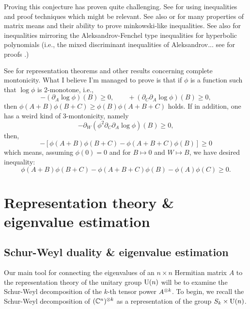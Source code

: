 \documentclass[notitlepage, 10pt]{article}
\begin{document}
{\color{red!80!black}
Proving this conjecture has proven quite challenging.
See \cite{marcus1957inequalities,mcleod1959four,anderson1984symmetric} for using inequalities and proof techniques which might be relevant.
See also \cite{anderson1984symmetric} or \cite[Chapter 4]{bhatia2009positive} for many properties of matrix means and their ability to prove minkowski-like inequalities.
See also \citeauthor{khovanskii1984analogues} \cite{khovanskii1984analogues} for inequalities mirroring the Aleksandrov-Fenchel type inequalities for hyperbolic polynomials (i.e., the mixed discriminant inequalities of Aleksandrov... see \citeauthor{shenfeld2019mixed} for proofs \cite{shenfeld2019mixed}.)

See \cite{kozhasov2019positivity} for representation theorems and other results concerning complete montonicity.
What I believe I'm managed to prove is that if $\phi$ is a function such that $\log \phi$ is 2-monotone, i.e.,
\begin{equation}
    - (\partial_{A}\log \phi)(B) \geq 0, \qquad + (\partial_{C}\partial_{A}\log \phi)(B) \geq 0,
\end{equation}
then $\phi(A+B)\phi(B+C) \geq \phi(B) \phi(A+B+C)$ holds.
If in addition, one has a weird kind of 3-montonicity, namely
\begin{equation}
    -\partial_{W}(\phi^2 \partial_{C}\partial_{A}\log \phi)(B) \geq 0,
\end{equation}
then,
\begin{equation}
    [\phi(A+B+W)\phi(B+C+W) - \phi(A+B+C+W)\phi(B+W)] - [\phi(A+B)\phi(B+C) - \phi(A+B+C)\phi(B)] \geq 0
\end{equation}
which means, assuming $\phi(0) = 0$ and for $B\mapsto 0$ and $W \mapsto B$, we have desired inequality:
\begin{equation}
    \phi(A+B)\phi(B+C) - \phi(A+B+C)\phi(B) - \phi(A)\phi(C) \geq 0.
\end{equation}
}

\section{Representation theory \& eigenvalue estimation}
\label{sec:rep_theory}

\subsection{Schur-Weyl duality \& eigenvalue estimation}

Our main tool for connecting the eigenvalues of an $n \times n$ Hermitian matrix $A$ to the representation theory of the unitary group $\operatorname{U}(n)$ will be to examine the Schur-Weyl decomposition of the $k$-th tensor power $A^{\otimes k}$.
To begin, we recall the Schur-Weyl decomposition of $(\mathbb C^{n})^{\otimes k}$ as a representation of the group $S_k \times \operatorname{U}(n)$.
\end{document}
